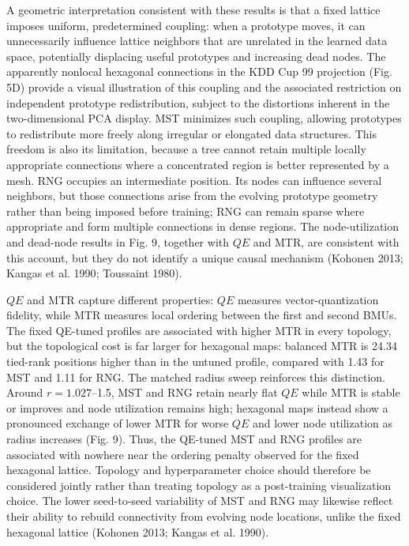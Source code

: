 \documentclass[
]{article}
\providecommand{\DIFadd}[1]{{\protect\color{blue} #1}} %
\providecommand{\DIFaddbegin}{} %
\providecommand{\DIFaddend}{} %
\begin{document}
\DIFadd{A geometric interpretation consistent with these results is that a fixed
lattice imposes uniform, predetermined coupling: when a prototype moves,
it can unnecessarily influence lattice neighbors that are unrelated in
the learned data space, potentially displacing useful prototypes and
increasing dead nodes. The apparently nonlocal hexagonal connections in
the KDD Cup 99 projection (Fig. 5D) provide a visual illustration of
this coupling and the associated restriction on independent prototype
redistribution, subject to the distortions inherent in the
two-dimensional PCA display. MST minimizes such coupling, allowing
prototypes to redistribute more freely along irregular or elongated data
structures. This freedom is also its limitation, because a tree cannot
retain multiple locally appropriate connections where a concentrated
region is better represented by a mesh. RNG occupies an intermediate
position. Its nodes can influence several neighbors, but those
connections arise from the evolving prototype geometry rather than being
imposed before training; RNG can remain sparse where appropriate and
form multiple connections in dense regions. The node-utilization and
dead-node results in Fig. 9, together with \(QE\) and MTR, are
consistent with this account, but they do not identify a unique causal
mechanism (Kohonen 2013; Kangas et al. 1990}\DIFaddend ; Toussaint  \DIFaddbegin \DIFadd{1980)}\DIFaddend .

 \DIFaddbegin \DIFadd{\(QE\) and MTR capture different properties: \(QE\) measures
vector-quantization fidelity, while MTR measures local ordering between
the first and second BMUs. The fixed QE-tuned profiles are associated
with higher MTR in every topology, but the topological cost is far
larger for hexagonal maps: balanced MTR is 24.34 tied-rank positions
higher than in the untuned profile, compared with 1.43 for MST and 1.11
for RNG. The matched radius sweep reinforces this distinction. Around
\(r=1.027\)--1.5, MST and RNG retain nearly flat \(QE\) while MTR is
stable or improves and node utilization remains high; hexagonal maps
instead show a pronounced exchange of lower MTR for worse \(QE\) and
lower node utilization as radius increases (Fig. 9). Thus, }\DIFaddend the  \DIFaddbegin \DIFadd{QE-tuned
}\DIFaddend MST and RNG  \DIFaddbegin \DIFadd{profiles are associated with nowhere near the ordering
penalty observed for the fixed hexagonal lattice. Topology and
hyperparameter choice should therefore be considered jointly rather than
treating topology as a post-training visualization choice. The lower
seed-to-seed variability of MST and RNG may likewise reflect their
ability to rebuild connectivity from evolving node locations, unlike the
fixed hexagonal lattice }\DIFaddend (Kohonen 2013; Kangas et al. 1990).
\end{document}
